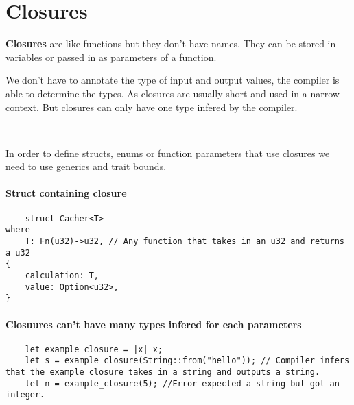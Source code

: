 \section{Closures}
\begin{definition}
    \textbf{Closures} are like functions but they don't have names. They can be stored in variables or passed in as parameters of a function.
\end{definition}
We don't have to annotate the type of input and output values, the compiler is able to determine the types. As closures are usually short and used in a narrow context. But closures can only have one type infered by the compiler.

\


In order to define structs, enums or function parameters that use closures we need to use generics and trait bounds.

\paragraph*{Struct containing closure}\begin{lstlisting}
    struct Cacher<T>
where 
    T: Fn(u32)->u32, // Any function that takes in an u32 and returns a u32
{
    calculation: T, 
    value: Option<u32>,
}
\end{lstlisting}


\paragraph*{Closuures can't have many types infered for each parameters}\begin{lstlisting}
    let example_closure = |x| x;
    let s = example_closure(String::from("hello")); // Compiler infers that the example closure takes in a string and outputs a string.
    let n = example_closure(5); //Error expected a string but got an integer. 
\end{lstlisting}

